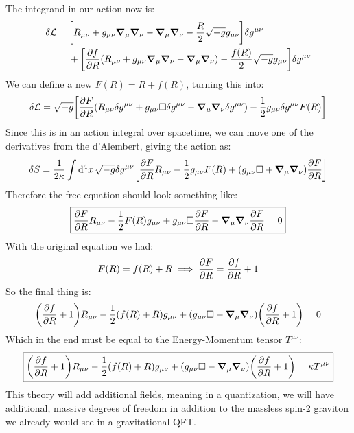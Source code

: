 \documentclass[12pt]{article}
\renewcommand{\L}{\mathcal{L}}
\newcommand{\munu}{{\mu\nu}}
\begin{document}
The integrand in our action now is:
\begin{align*}
  \delta\L=\,&\qty[R_\munu+g_\munu\grad_\mu\grad_\nu-\grad_\mu\grad_\nu
  -\frac{R}{2}\sqrt{-g}g_\munu]\delta g^\munu\\\,&+
  \qty[\pdv{f}{R}\qty(R_\munu+g_\munu\grad_\mu\grad_\nu-\grad_\mu\grad_\nu)
  -\frac{f(R)}{2}\sqrt{-g}g_\munu]\delta g^\munu
\end{align*}
We can define a new $F(R)=R+f(R)$, turning this into:
\begin{align*}
  \delta\L=\sqrt{-g}\qty[\pdv{F}{R}\qty(R_\munu\delta g^\munu
  +g_\munu\Box\delta g^\munu
  -\grad_\mu\grad_\nu\delta g^\munu)
  -\frac{1}{2}g_\munu\delta g^\munu F(R)]
\end{align*}
Since this is in an action integral over spacetime, we can move one of the derivatives from the d'Alembert, giving the action as:
\begin{align*}
  \delta S=\frac{1}{2\kappa}\int\dd[4]{x}\sqrt{-g}\delta g^\munu
  \qty[\pdv{F}{R}R_\munu-\frac{1}{2}g_\munu F(R)
  +\qty(g_\munu\Box+\grad_\mu\grad_\nu)\pdv{F}{R}]
\end{align*}
Therefore the free equation should look something like:
\begin{align*}
  \boxed{\pdv{F}{R}R_\munu-\frac{1}{2}F(R)g_\munu+g_\munu\Box\pdv{F}{R}
  -\grad_\mu\grad_\nu\pdv{F}{R}=0}
\end{align*}
With the original equation we had:
\begin{align*}
  F(R)=f(R)+R\implies\pdv{F}{R}=\pdv{f}{R}+1
\end{align*}
So the final thing is:
\begin{align*}
  \qty(\pdv{f}{R}+1)R_\munu-\frac{1}{2}(f(R)+R)g_\munu
  +\qty(g_\munu\Box-\grad_\mu\grad_\nu)\qty(\pdv{f}{R}+1)=0
\end{align*}
Which in the end must be equal to the Energy-Momentum tensor $T^\munu$:
\begin{align*}
  \boxed{\qty(\pdv{f}{R}+1)R_\munu-\frac{1}{2}(f(R)+R)g_\munu
  +\qty(g_\munu\Box-\grad_\mu\grad_\nu)\qty(\pdv{f}{R}+1)=\kappa T^\munu}
\end{align*}
This theory will add additional fields, meaning in a quantization, we will have additional, massive degrees of freedom in addition to the massless spin-2 graviton we already would see in a gravitational QFT. 
\end{document}
